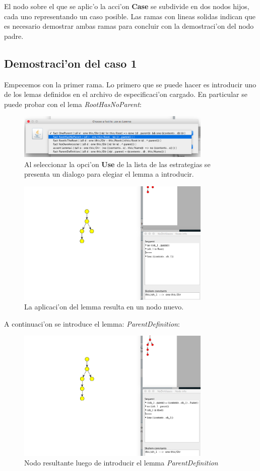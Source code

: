 El nodo sobre el que se aplic'o la acci'on \textbf{Case} se subdivide en dos nodos hijos, cada uno representando un caso posible. Las ramas con lineas solidas indican que es necesario demostrar ambas ramas para concluir con la demostraci'on del nodo padre.

\subsection{Demostraci'on del caso 1}

Empecemos con la primer rama. Lo primero que se puede hacer es introducir uno de los lemas definidos en el archivo de especificaci'on cargado. En particular se puede probar con el lema \textit{RootHasNoParent}:

\begin{figure}[H]
	\includegraphics[width=350px]{img/ejemplo/9.png}
	\centering
	\caption{Al seleccionar la opci'on \textbf{Use} de la lista de las estrategias se presenta un dialogo para elegiar el lemma a introducir.}
\end{figure}

\begin{figure}[H]
	\includegraphics[width=350px]{img/ejemplo/10.png}
	\centering
	\caption{La aplicaci'on del lemma resulta en un nodo nuevo.}
\end{figure}

A continuaci'on se introduce el lemma: \textit{ParentDefinition}:

\begin{figure}[H]
	\includegraphics[width=350px]{img/ejemplo/12.png}
	\centering
	\caption{Nodo resultante luego de introducir el lemma \textit{ParentDefinition}}
\end{figure}

